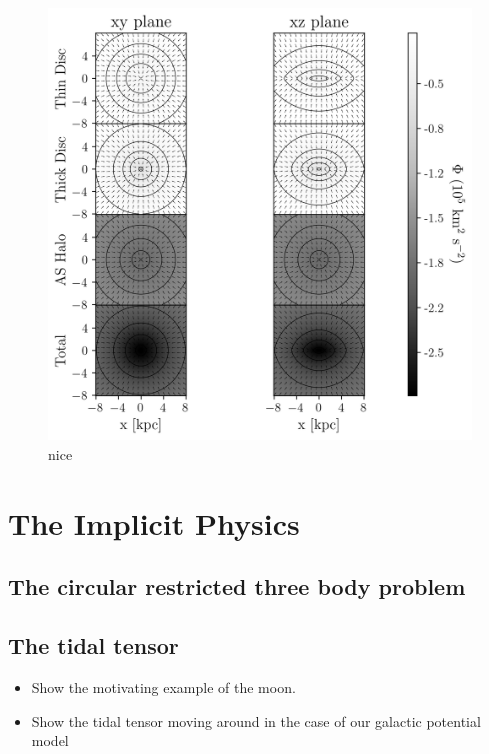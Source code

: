         \begin{figure}
            \centering
            \includegraphics[width=\linewidth]{images/figure_pouliasis2017pii_potential_-8_8.png}
            \caption{nice}
        \end{figure}        
    

\section{The Implicit Physics}

    \subsection{The circular restricted three body problem}

    \subsection{The tidal tensor}
        \begin{itemize}
            \item Show the motivating example of the moon. 
            \item Show the tidal tensor moving around in the case of our galactic potential model 
        \end{itemize}


